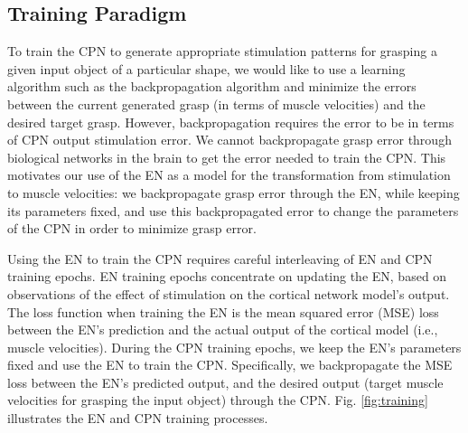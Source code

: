 \documentclass[12pt]{iopart}
\begin{document}
\subsection{Training Paradigm}
\label{sec:training}

To train the CPN to generate appropriate stimulation patterns for grasping a given input object of a
particular shape, we would like to use a learning algorithm such as the backpropagation algorithm and
minimize the errors between the current generated grasp (in terms of muscle velocities) and the desired target
grasp. However, backpropagation requires the error to be in terms of CPN output stimulation error. We cannot  
backpropagate grasp error through biological networks in the brain to get the error needed to train the CPN. 
This motivates our use of the EN as a model for the transformation from stimulation to muscle velocities:
we backpropagate grasp error through the EN, while keeping its parameters fixed, and use this
backpropagated error to change the parameters of the CPN in order to minimize grasp error.

Using the EN to train the CPN requires careful interleaving of EN and CPN training epochs. EN training
epochs concentrate on updating the EN, based on observations of the effect of stimulation on the cortical
network model's output. The loss function when training the EN is the mean squared error (MSE) loss between
the EN's prediction and the  actual output of the cortical model (i.e., muscle velocities). During the CPN
training epochs, we keep the EN's parameters fixed and use the EN to train the CPN. Specifically, we
backpropagate the MSE loss between the EN's predicted output, and the desired output (target muscle velocities
for grasping the input object) through the CPN. Fig. \ref{fig:training} illustrates the EN and CPN training
processes.
\end{document}
